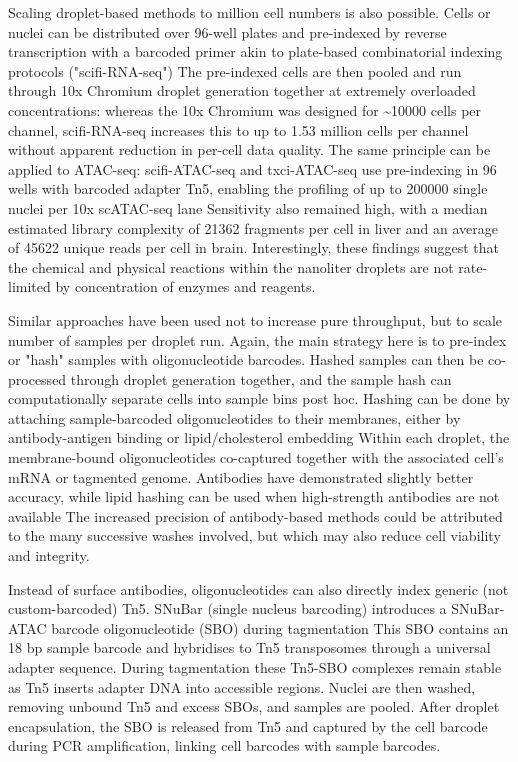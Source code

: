 Scaling droplet-based methods to million cell numbers is also possible. Cells or nuclei can be distributed over 96-well plates and pre-indexed by reverse transcription with a barcoded primer akin to plate-based combinatorial indexing protocols ("scifi-RNA-seq") The pre-indexed cells are then pooled and run through 10x Chromium droplet generation together at extremely overloaded concentrations: whereas the 10x Chromium was designed for \textasciitilde\num{10000} cells per channel, scifi-RNA-seq increases this to up to 1.53 million cells per channel without apparent reduction in per-cell data quality. The same principle can be applied to ATAC-seq: scifi-ATAC-seq and txci-ATAC-seq use pre-indexing in 96 wells with barcoded adapter Tn5, enabling the profiling of up to \num{200000} single nuclei per 10x scATAC-seq lane Sensitivity also remained high, with a median estimated library complexity of \num{21362} fragments per cell in liver and an average of \num{45622} unique reads per cell in brain. Interestingly, these findings suggest that the chemical and physical reactions within the nanoliter droplets are not rate-limited by concentration of enzymes and reagents.

Similar approaches have been used not to increase pure throughput, but to scale number of samples per droplet run. Again, the main strategy here is to pre-index or "hash" samples with oligonucleotide barcodes. Hashed samples can then be co-processed through droplet generation together, and the sample hash can computationally separate cells into sample bins post hoc. Hashing can be done by attaching sample-barcoded oligonucleotides to their membranes, either by antibody-antigen binding or lipid/cholesterol embedding Within each droplet, the membrane-bound oligonucleotides co-captured together with the associated cell's mRNA or tagmented genome. Antibodies have demonstrated slightly better accuracy, while lipid hashing can be used when high-strength antibodies are not available The increased precision of antibody-based methods could be attributed to the many successive washes involved, but which may also reduce cell viability and integrity.

Instead of surface antibodies, oligonucleotides can also directly index generic (not custom-barcoded) Tn5. SNuBar (single nucleus barcoding) introduces a SNuBar-ATAC barcode oligonucleotide (SBO) during tagmentation This SBO contains an 18 bp sample barcode and hybridises to Tn5 transposomes through a universal adapter sequence. During tagmentation these Tn5-SBO complexes remain stable as Tn5 inserts adapter DNA into accessible regions. Nuclei are then washed, removing unbound Tn5 and excess SBOs, and samples are pooled. After droplet encapsulation, the SBO is released from Tn5 and captured by the cell barcode during PCR amplification, linking cell barcodes with sample barcodes.

